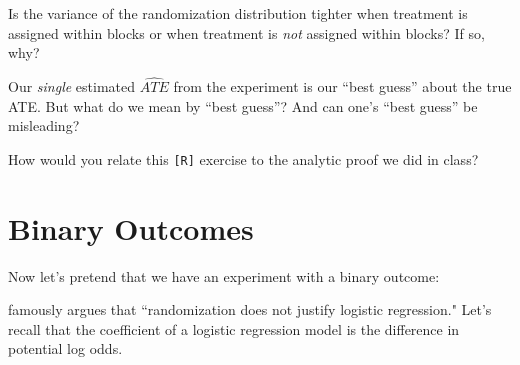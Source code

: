 \documentclass[11pt,leqno]{article}\usepackage[]{graphicx}\usepackage[]{color}
\theoremstyle{newstyle}
\begin{document}
Is the variance of the randomization distribution tighter when treatment is assigned within blocks or when treatment is \textit{not} assigned within blocks? If so, why?

Our \textit{single} estimated $\widehat{ATE}$ from the experiment is our ``best guess'' about the true ATE. But what do we mean by ``best guess''? And can one's ``best guess'' be misleading?

How would you relate this \texttt{[R]} exercise to the analytic proof we did in class?

\section{Binary Outcomes}

Now let's pretend that we have an experiment with a binary outcome:

\citet{freedman2008b} famously argues that ``randomization does not justify logistic regression." Let's recall that the coefficient of a logistic regression model is the difference in potential log odds.
\end{document}
